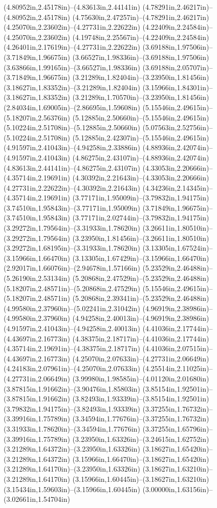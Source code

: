 (4.80952in,2.45178in)--(4.83613in,2.44141in) (4.78291in,2.46217in)--(4.80952in,2.45178in) (4.75630in,2.47257in)--(4.78291in,2.46217in) (4.25070in,2.23602in)--(4.27731in,2.22622in) (4.22409in,2.24584in)--(4.25070in,2.23602in) (4.19748in,2.25567in)--(4.22409in,2.24584in) (4.26401in,2.17619in)--(4.27731in,2.22622in) (3.69188in,1.97506in)--(3.71849in,1.96675in) (3.66527in,1.98336in)--(3.69188in,1.97506in) (3.63866in,1.99165in)--(3.66527in,1.98336in) (3.69188in,2.05707in)--(3.71849in,1.96675in) (3.21289in,1.82404in)--(3.23950in,1.81456in) (3.18627in,1.83352in)--(3.21289in,1.82404in) (3.15966in,1.84301in)--(3.18627in,1.83352in) (3.21289in,1.70570in)--(3.23950in,1.81456in) (2.84034in,1.69005in)--(2.86695in,1.59608in) (5.15546in,2.49615in)--(5.18207in,2.56376in) (5.12885in,2.50660in)--(5.15546in,2.49615in) (5.10224in,2.51708in)--(5.12885in,2.50660in) (5.07563in,2.52756in)--(5.10224in,2.51708in) (5.12885in,2.42307in)--(5.15546in,2.49615in) (4.91597in,2.41043in)--(4.94258in,2.33886in) (4.88936in,2.42074in)--(4.91597in,2.41043in) (4.86275in,2.43107in)--(4.88936in,2.42074in) (4.83613in,2.44141in)--(4.86275in,2.43107in) (4.33053in,2.20666in)--(4.35714in,2.19691in) (4.30392in,2.21643in)--(4.33053in,2.20666in) (4.27731in,2.22622in)--(4.30392in,2.21643in) (4.34236in,2.14345in)--(4.35714in,2.19691in) (3.77171in,1.95009in)--(3.79832in,1.94175in) (3.74510in,1.95843in)--(3.77171in,1.95009in) (3.71849in,1.96675in)--(3.74510in,1.95843in) (3.77171in,2.02744in)--(3.79832in,1.94175in) (3.29272in,1.79564in)--(3.31933in,1.78620in) (3.26611in,1.80510in)--(3.29272in,1.79564in) (3.23950in,1.81456in)--(3.26611in,1.80510in) (3.29272in,1.68195in)--(3.31933in,1.78620in) (3.13305in,1.67524in)--(3.15966in,1.66470in) (3.13305in,1.67429in)--(3.15966in,1.66470in) (2.92017in,1.66076in)--(2.94678in,1.57166in) (5.23529in,2.46488in)--(5.26190in,2.53134in) (5.20868in,2.47529in)--(5.23529in,2.46488in) (5.18207in,2.48571in)--(5.20868in,2.47529in) (5.15546in,2.49615in)--(5.18207in,2.48571in) (5.20868in,2.39341in)--(5.23529in,2.46488in) (4.99580in,2.37960in)--(5.02241in,2.31042in) (4.96919in,2.38986in)--(4.99580in,2.37960in) (4.94258in,2.40013in)--(4.96919in,2.38986in) (4.91597in,2.41043in)--(4.94258in,2.40013in) (4.41036in,2.17744in)--(4.43697in,2.16773in) (4.38375in,2.18717in)--(4.41036in,2.17744in) (4.35714in,2.19691in)--(4.38375in,2.18717in) (4.41036in,2.07515in)--(4.43697in,2.16773in) (4.25070in,2.07633in)--(4.27731in,2.06649in) (4.24183in,2.07961in)--(4.25070in,2.07633in) (4.25514in,2.11025in)--(4.27731in,2.06649in) (3.99980in,1.98585in)--(4.01120in,2.01680in) (3.87815in,1.91662in)--(3.90476in,1.85803in) (3.85154in,1.92501in)--(3.87815in,1.91662in) (3.82493in,1.93339in)--(3.85154in,1.92501in) (3.79832in,1.94175in)--(3.82493in,1.93339in) (3.37255in,1.76732in)--(3.39916in,1.75789in) (3.34594in,1.77676in)--(3.37255in,1.76732in) (3.31933in,1.78620in)--(3.34594in,1.77676in) (3.37255in,1.65796in)--(3.39916in,1.75789in) (3.23950in,1.63326in)--(3.24615in,1.62752in) (3.21289in,1.64372in)--(3.23950in,1.63326in) (3.18627in,1.65420in)--(3.21289in,1.64372in) (3.15966in,1.66470in)--(3.18627in,1.65420in) (3.21289in,1.64170in)--(3.23950in,1.63326in) (3.18627in,1.63210in)--(3.21289in,1.64170in) (3.15966in,1.60445in)--(3.18627in,1.63210in) (3.15434in,1.59603in)--(3.15966in,1.60445in) (3.00000in,1.63156in)--(3.02661in,1.54704in) 